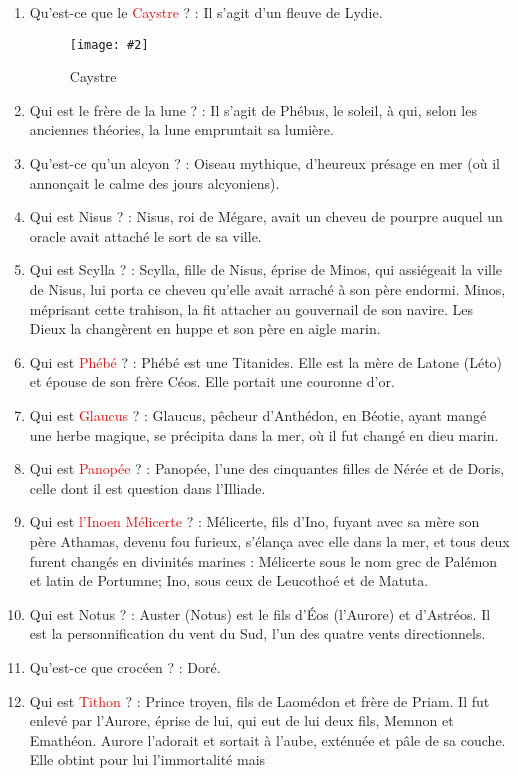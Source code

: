 \documentclass[a4paper, 11pt, hidelinks]{article}
\newcommand{\img}[4]{\begin{figure}[!ht]
    \centering
    \texttt{[image: \#2]}
    \caption{#3}
    \label{#4}
    \end{figure} }
\begin{document}
\begin{enumerate}
      \item Qu'est-ce que le \textcolor{red}{Caystre} ? : Il s'agit d'un fleuve de Lydie.
            \img{0.4}{Caystre.png}{Caystre}{46}
      \item Qui est le frère de la lune ? : Il s'agit de Phébus, le soleil, à qui, selon les anciennes théories, la lune empruntait sa lumière.
      \item Qu'est-ce qu'un alcyon ? : Oiseau mythique, d'heureux présage en mer (où il annonçait le calme des jours alcyoniens).
      \item Qui est Nisus ? : Nisus, roi de Mégare, avait un cheveu de pourpre auquel un oracle avait attaché le sort de sa ville.
      \item Qui est Scylla ? : Scylla, fille de Nisus, éprise de Minos, qui assiégeait la ville de Nisus, lui porta ce cheveu qu'elle avait
            arraché à son père endormi. Minos, méprisant cette trahison, la fit attacher au gouvernail de son navire. Les Dieux la changèrent
            en huppe et son père en aigle marin.
      \item Qui est \textcolor{red}{Phébé} ? : Phébé est une Titanides. Elle est la mère de Latone (Léto) et épouse de son frère Céos. Elle portait une couronne d'or.
      \item Qui est \textcolor{red}{Glaucus} ? : Glaucus, pêcheur d'Anthédon, en Béotie, ayant mangé une herbe magique, se précipita dans la mer, où il fut changé en dieu marin.
      \item Qui est \textcolor{red}{Panopée} ? : Panopée, l'une des cinquantes filles de Nérée et de Doris, celle dont il est question dans l'Illiade.
      \item Qui est \textcolor{red}{l'Inoen Mélicerte} ? : Mélicerte, fils d'Ino, fuyant avec sa mère son père Athamas, devenu fou furieux, s'élança avec
            elle dans la mer, et tous deux furent changés en divinités marines : Mélicerte sous le nom grec de Palémon et latin de Portumne; Ino, sous
            ceux de Leucothoé et de Matuta.
      \item Qui est Notus ? : Auster (Notus) est le fils d'Éos (l'Aurore) et d'Astréos. Il est la personnification du vent du Sud,
            l'un des quatre vents directionnels.
      \item Qu'est-ce que crocéen ? : Doré.
      \item Qui est \textcolor{red}{Tithon} ? : Prince troyen, fils de Laomédon et frère de Priam. Il fut enlevé par l'Aurore, éprise de lui, qui eut de lui
            deux fils, Memnon et Emathéon. Aurore l'adorait et sortait à l'aube, exténuée et pâle de sa couche. Elle obtint pour lui l'immortalité mais

\end{enumerate}
\end{document}
